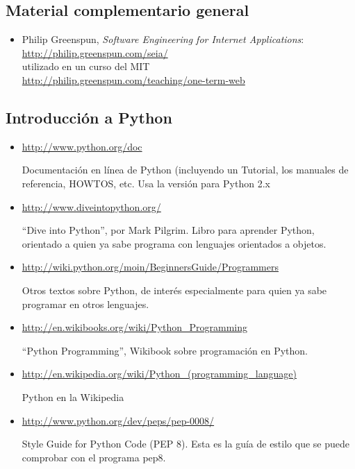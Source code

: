 \subsection{Material complementario general}

\begin{itemize}
\item Philip Greenspun, \textsl{Software Engineering for Internet Applications}:\\
  \url{http://philip.greenspun.com/seia/} \\
  utilizado en un curso del MIT \\
  \url{http://philip.greenspun.com/teaching/one-term-web}
\end{itemize}

\subsection{Introducción a Python}

\begin{itemize}
\item \url{http://www.python.org/doc}

Documentación en línea de Python (incluyendo un Tutorial, los manuales de referencia, HOWTOS, etc. Usa la versión para Python 2.x

\item \url{http://www.diveintopython.org/}

``Dive into Python'', por Mark Pilgrim. Libro para aprender Python, orientado a quien ya sabe programa con lenguajes orientados a objetos.

\item \url{http://wiki.python.org/moin/BeginnersGuide/Programmers}

Otros textos sobre Python, de interés especialmente para quien ya sabe programar en otros lenguajes.

\item \url{http://en.wikibooks.org/wiki/Python_Programming}

``Python Programming'', Wikibook sobre programación en Python.

\item \url{http://en.wikipedia.org/wiki/Python_(programming_language)}

Python en la Wikipedia

\item \url{http://www.python.org/dev/peps/pep-0008/}

Style Guide for Python Code (PEP 8). Esta es la guía de estilo que se puede comprobar con el programa pep8.
\end{itemize}

